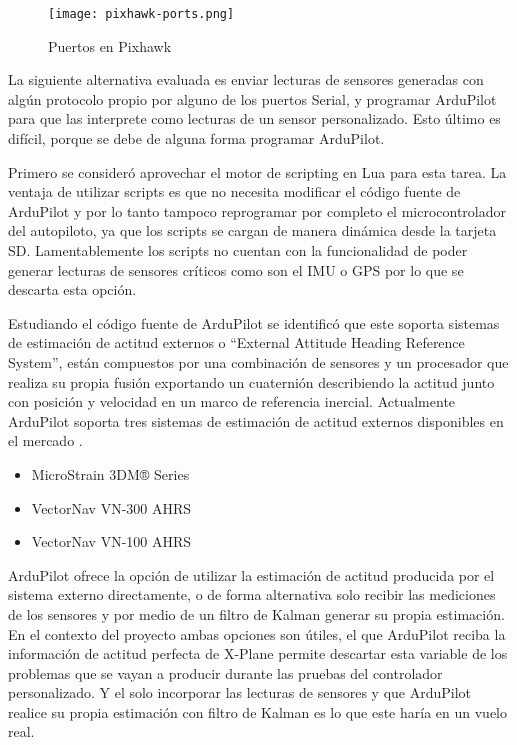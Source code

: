 \begin{figure}[h]
    \centering
    \texttt{[image: pixhawk-ports.png]}
    \caption{Puertos en Pixhawk}
    \label{fig:pixhawk-ports}
\end{figure}

La siguiente alternativa evaluada es enviar lecturas de sensores generadas con algún protocolo propio por alguno de los puertos Serial, y programar ArduPilot para que las interprete como lecturas de un sensor personalizado. Esto último es difícil, porque se debe de alguna forma programar ArduPilot.

Primero se consideró aprovechar el motor de scripting en Lua para esta tarea. La ventaja de utilizar scripts es que no necesita modificar el código fuente de ArduPilot y por lo tanto tampoco reprogramar por completo el microcontrolador del autopiloto, ya que los scripts se cargan de manera dinámica desde la tarjeta SD. Lamentablemente los scripts no cuentan con la funcionalidad de poder generar lecturas de sensores críticos como son el IMU o GPS por lo que se descarta esta opción.

Estudiando el código fuente de ArduPilot se identificó que este soporta sistemas de estimación de actitud externos o ``External Attitude Heading Reference System'', están compuestos por una combinación de sensores y un procesador que realiza su propia fusión exportando un cuaternión describiendo la actitud junto con posición y velocidad en un marco de referencia inercial. Actualmente ArduPilot soporta tres sistemas de estimación de actitud externos disponibles en el mercado \cite{ap-eahrs}.

\begin{itemize}
    \item MicroStrain 3DM® Series
    \item VectorNav VN-300 AHRS
    \item VectorNav VN-100 AHRS
\end{itemize}

ArduPilot ofrece la opción de utilizar la estimación de actitud producida por el sistema externo directamente, o de forma alternativa solo recibir las mediciones de los sensores y por medio de un filtro de Kalman generar su propia estimación. En el contexto del proyecto ambas opciones son útiles, el que ArduPilot reciba la información de actitud perfecta de X-Plane permite descartar esta variable de los problemas que se vayan a producir durante las pruebas del controlador personalizado. Y el solo incorporar las lecturas de sensores y que ArduPilot realice su propia estimación con filtro de Kalman es lo que este haría en un vuelo real.

